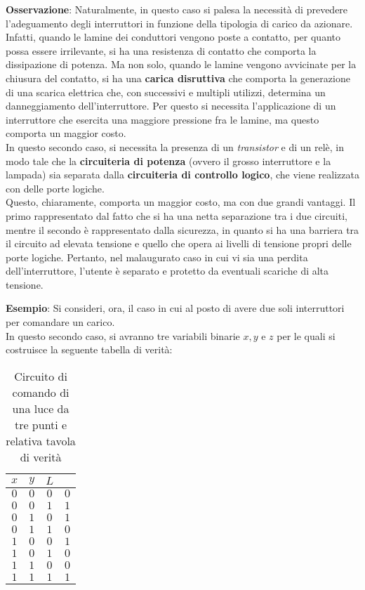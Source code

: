 \documentclass[a4paper]{extarticle}
\begin{document}
\vspace{1em}
\noindent
\textbf{Osservazione}: Naturalmente, in questo caso si palesa la necessità di prevedere l'adeguamento degli interruttori in funzione della tipologia di carico da azionare.\\
Infatti, quando le lamine dei conduttori vengono poste a contatto, per quanto possa essere irrilevante, si ha una resistenza  di contatto che comporta la dissipazione di potenza. Ma non solo, quando le lamine vengono avvicinate per la chiusura del contatto, si ha una \textbf{carica disruttiva} che comporta la generazione di una scarica elettrica che, con successivi e multipli utilizzi, determina un danneggiamento dell'interruttore. Per questo si necessita l'applicazione di un interruttore che esercita una maggiore pressione fra le lamine, ma questo comporta un maggior costo.\\
In questo secondo caso, si necessita la presenza di un \textit{transistor} e di un relè, in modo tale che la \textbf{circuiteria di potenza} (ovvero il grosso interruttore e la lampada) sia separata dalla \textbf{circuiteria di controllo logico}, che viene realizzata con delle porte logiche.\\
Questo, chiaramente, comporta un maggior costo, ma con due grandi vantaggi. Il primo rappresentato dal fatto che si ha una netta separazione tra i due circuiti, mentre il secondo è rappresentato dalla sicurezza, in quanto si ha una barriera tra il circuito ad elevata tensione e quello che opera ai livelli di tensione propri delle porte logiche. Pertanto, nel malaugurato caso in cui vi sia una perdita dell'interruttore, l'utente è separato e protetto da eventuali scariche di alta tensione.

\vspace{1em}
\noindent
\textbf{Esempio}: Si consideri, ora, il caso in cui al posto di avere due soli interruttori per comandare un carico.\\
In questo secondo caso, si avranno tre variabili binarie \(x, y\) e \(z\) per le quali si costruisce la seguente tabella di verità:

\begin{table}[H]
    \centering
    \begin{tabular}{ccc|c}
         \(x\) & \(y\) & \(L\)\\
         \hline
         \(0\) & \(0\) & \(0\) & \(0\)\\
         \(0\) & \(0\) & \(1\) & \(1\)\\
         \(0\) & \(1\) & \(0\) & \(1\)\\
         \(0\) & \(1\) & \(1\) & \(0\)\\
         \(1\) & \(0\) & \(0\) & \(1\)\\
         \(1\) & \(0\) & \(1\) & \(0\)\\
         \(1\) & \(1\) & \(0\) & \(0\)\\
         \(1\) & \(1\) & \(1\) & \(1\)\\
    \end{tabular}
    \caption{Circuito di comando di una luce da tre punti e relativa tavola di verità}
    \label{tab:circuito_luce_tre_punti_tavola_verita}
\end{table}
\end{document}
